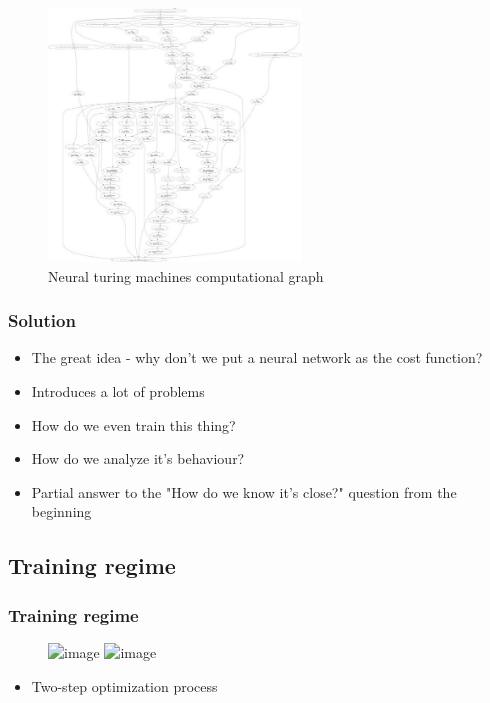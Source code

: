 \documentclass{Bredelebeamer}
\begin{document}
\begin{frame}
	\begin{figure}[h!]
	\centering
	\includegraphics[width=0.6\textwidth]{ntm_comp_graph.jpg}
	\caption{Neural turing machines computational graph}
	\label{fig:ntm_comp_graph}
	\end{figure}

\end{frame}
\begin{frame}
	\frametitle{Solution}
	\begin{itemize}
		\item The great idea - why don't we put a neural network as the cost function?
		\item Introduces a lot of problems
		\item How do we even train this thing?
		\item How do we analyze it's behaviour?
		\item Partial answer to the "How do we know it's close?" question from the beginning
	\end{itemize}
\end{frame}

\subsection{Training regime}
\begin{frame}
	\frametitle{Training regime}
	\begin{figure}[h!]
	\centering
	\includegraphics<1>[width=\textwidth]{GAN_optimization.png}
	\includegraphics<2->[width=\textwidth]{GAN_optimization_two_step.png}
	\end{figure}
	\pause
	\begin{itemize}
		\item Two-step optimization process
	\end{itemize}
\end{frame}
\end{document}
